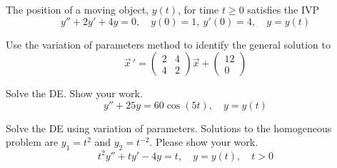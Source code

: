 \documentclass[12pt]{exam}
\begin{document}
\begin{questions}
    \newpage \Initials
    
    \question[4] The position of a moving object, $y(t)$, for time $t \ge 0$ satisfies the IVP
    $$y''+ 2y' + 4y=0,\quad y(0)=1,\ y'(0)=4,  \quad y=y(t)$$
    

    
    \newpage \Initials

    \question[10] Use the variation of parameters method to identify the general solution to \[\vec{x} \, ' = \left( \begin{array}{rr} 2 & 4 \\ 4 & 2 \end{array} \right) \vec{x}  + \left( \begin{array}{r}  12 \\ 0 \end{array} \right)  \]
    

    \newpage \Initials

    \question[10] Solve the DE. Show your work. $$y'' + 25y = 60\cos(5t), \quad y=y(t)$$
    
    \newpage \Initials

    \question[10] Solve the DE using variation of parameters. Solutions to the homogeneous problem are $y_1 = t^{2}$ and $y_2 = t^{-2}$. Please show your work. $$t^2y'' + ty' -4y = t, \quad y=y(t), \quad t > 0$$    


\end{questions}
\end{document}
